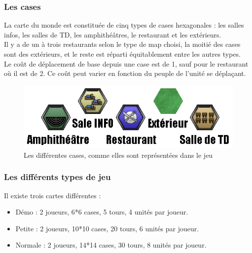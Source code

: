 \subsubsection{Les cases}
La carte du monde est constituée de cinq types de cases hexagonales : les salles infos, les salles de TD, les amphithéâtres, le restaurant et les extérieurs.\\
Il y a de un à trois restaurants selon le type de map choisi, la moitié des cases sont des extérieurs, et le reste est réparti équitablement entre les autres types.\\
Le coût de déplacement de base depuis une case est de 1, sauf pour le restaurant où il est de 2. Ce coût peut varier en fonction du peuple de l'unité se déplaçant.
\begin{figure}[!h]
\centering
\includegraphics[width=.7\textwidth]{Parties/Images/Terrains.png}
\caption{Les différentes cases, comme elles sont représentées dans le jeu}
\label{fig:Terrains}
\end{figure}


\subsubsection{Les différents types de jeu}
Il existe trois cartes différentes :
\begin{itemize}
\item Démo : 2 joueurs, 6*6 cases, 5 tours, 4 unités par joueur.
\item Petite : 2 joueurs, 10*10 cases, 20 tours, 6 unités par joueur.
\item Normale : 2 joueurs, 14*14 cases, 30 tours, 8 unités par joueur.
\end{itemize}
